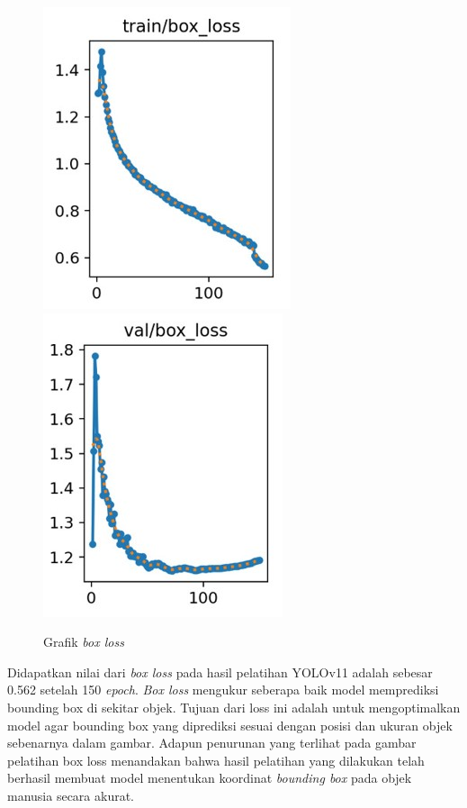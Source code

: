 \begin{figure} [H] \centering
  \includegraphics[scale=0.55]{gambar/train box loss.jpg}
  \includegraphics[scale=0.55]{gambar/val box loss.jpg}
  \caption{Grafik \emph{box loss}}
  \label{fig:Pengujian Performa}
\end{figure}
Didapatkan nilai dari \emph{box loss} pada hasil pelatihan YOLOv11 adalah sebesar 0.562
setelah 150 \emph{epoch}. \emph{Box loss} mengukur seberapa baik model memprediksi bounding
box di sekitar objek. Tujuan dari loss ini adalah untuk mengoptimalkan model
agar bounding box yang diprediksi sesuai dengan posisi dan ukuran objek sebenarnya dalam gambar.
Adapun penurunan yang terlihat pada gambar pelatihan box loss menandakan bahwa hasil
pelatihan yang dilakukan telah berhasil membuat model menentukan koordinat \emph{bounding box}
pada objek manusia secara akurat.

